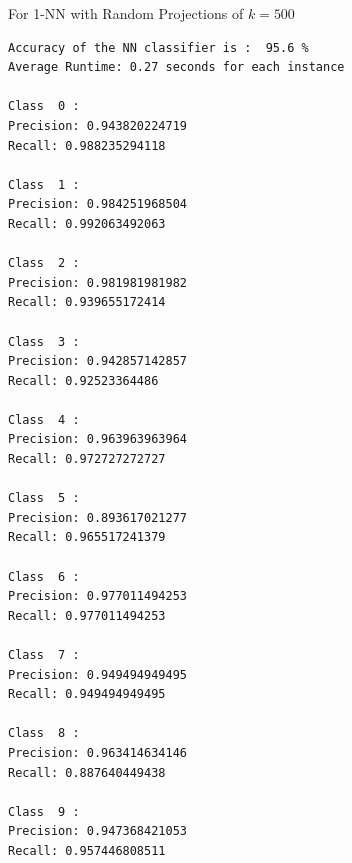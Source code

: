 For 1-NN with Random Projections of $k=500$

\begin{lstlisting}[frame=single]
Accuracy of the NN classifier is :  95.6 %
Average Runtime: 0.27 seconds for each instance

Class  0 :
Precision: 0.943820224719
Recall: 0.988235294118

Class  1 :
Precision: 0.984251968504
Recall: 0.992063492063

Class  2 :
Precision: 0.981981981982
Recall: 0.939655172414

Class  3 :
Precision: 0.942857142857
Recall: 0.92523364486

Class  4 :
Precision: 0.963963963964
Recall: 0.972727272727

Class  5 :
Precision: 0.893617021277
Recall: 0.965517241379

Class  6 :
Precision: 0.977011494253
Recall: 0.977011494253

Class  7 :
Precision: 0.949494949495
Recall: 0.949494949495

Class  8 :
Precision: 0.963414634146
Recall: 0.887640449438

Class  9 :
Precision: 0.947368421053
Recall: 0.957446808511
\end{lstlisting}

